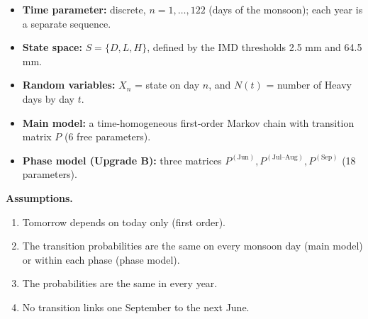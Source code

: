 \documentclass[11pt,a4paper]{article}
\providecommand{\tightlist}{\setlength{\itemsep}{0pt}\setlength{\parskip}{0pt}}
\begin{document}
\begin{itemize}

\tightlist

\item

  \textbf{Time parameter:} discrete, \(n=1,\dots,122\) (days of the monsoon); each year is a separate sequence.

\item

  \textbf{State space:} \(S=\{D, L, H\}\), defined by the IMD thresholds 2.5 mm and 64.5 mm.

\item

  \textbf{Random variables:} \(X_n\) = state on day \(n\), and \(N(t)\) = number of Heavy days by day \(t\).

\item

  \textbf{Main model:} a time-homogeneous first-order Markov chain with transition matrix \(P\) (6 free parameters).

\item

  \textbf{Phase model (Upgrade B):} three matrices \(P^{(\text{Jun})}, P^{(\text{Jul–Aug})}, P^{(\text{Sep})}\) (18 parameters).

\end{itemize}



\textbf{Assumptions.}



\begin{enumerate}

\def\labelenumi{\arabic{enumi}.}

\tightlist

\item

  Tomorrow depends on today only (first order).

\item

  The transition probabilities are the same on every monsoon day (main model) or within each phase (phase model).

\item

  The probabilities are the same in every year.

\item

  No transition links one September to the next June.

\end{enumerate}
\end{document}
